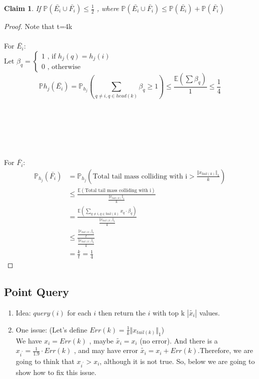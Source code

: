 \documentclass[11pt]{article}
\newtheorem{claim}[theorem]{Claim}
\begin{document}
\begin{claim} 
If $\mathbb{P}( \bar{E_i} \cup \bar{F_i}) \leq \frac{1}{2}$ , where $\mathbb{P}( \bar{E_i} \cup \bar{F_i}) \leq \mathbb{P}(\bar{E_i}) + \mathbb{P}(\bar{F_i})$
\end{claim}
\begin{proof} Note that t=4k
\text{ }\\
\text{ }\\
For $\bar{E_i}:$ \\
$ \text{Let } \beta_q = \begin{cases} 1\text{ , if } h_j(q) = h_j(i)\\
                                           0\text{ , otherwise}
                             \end{cases}$\\
\[\mathbb{P}{h_j}(\bar{E_i}) = \mathbb{P}_{h_j}(\sum\limits_{q \neq i, q \in head(k)}{\beta_q} \geq 1) \leq \frac{\mathbb{E}(\sum{\beta_q})}{1} \leq \frac{1}{4}\] \\

\text{ }\\
\text{ }\\
\text{ }\\
\text{ }\\
\text{ }\\
For $\bar{F_i}:$ \\

\begin{align*}
\mathbb{P}_{h_j}(\bar{F_i}) & = \mathbb{P}_{h_j}(\text{Total tail mass colliding with i} > \frac{\Vert x_{tail(k)}\Vert_1}{k}) \\ &\leq 
\frac{\mathbb{E}(\text{Total tail mass colliding with i})}{\frac{\Vert x_{tail(k)}\Vert_1}{k}} \\&=
\frac{\mathbb{E}(\sum\limits_{q \neq i, q \in tail(k)} x_q \cdot \beta_q)}{\frac{\Vert x_{tail(k)}\Vert_1}{k}} \\ &\leq 
\frac{\frac{\Vert x_{tail(k)}\Vert_1 }{t}}{\frac{\Vert x_{tail(k)}\Vert_1}{k}} \\& = \frac{k}{t} = \frac{1}{4}
\end{align*}

\end{proof}

\subsection*{Point Query}
\begin{enumerate}
\item Idea: $query(i)$ for each $i$ then return the $i$ with top k $|\tilde{x_i}|$ values.
\text{  }\\
\item One issue: (Let's define $Err(k) = \frac{1}{k}\Vert x_{tail(k)}\Vert_1$) \\
We have $x_i = Err(k)$ , maybe $\tilde{x_i} = x_i$ (no error). And there is a  $x_{i^\prime} = \frac{1}{1.9} \cdot Err(k)$ , and may have error $\tilde{x_i} = x_i + Err(k)$.Therefore, we are going to think that $x_{i^{\prime}} > x_i$, although it is not true. So, below we are going to show how to fix this issue.
\end{enumerate}
\end{document}
